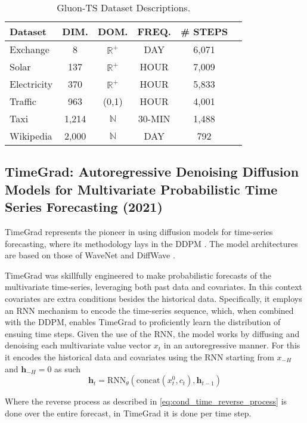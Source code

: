 \begin{table}[t] 
\centering
\begin{tabular}{lccccc} 
    \toprule
    Dataset & DIM. & DOM. & FREQ. & \# STEPS \\
    \midrule
    Exchange & 8 & $\mathbb{R}^+$ & DAY & 6,071 \\
    Solar & 137 & $\mathbb{R}^+$ & HOUR & 7,009 \\
    Electricity & 370 & $\mathbb{R}^+$ & HOUR & 5,833 \\
    Traffic & 963 & (0,1) & HOUR & 4,001 \\
    Taxi & 1,214 & $\mathbb{N}$ & 30-MIN & 1,488 \\
    Wikipedia & 2,000 & $\mathbb{N}$ & DAY & 792 \\
    \bottomrule
\end{tabular}
\caption{Gluon-TS Dataset Descriptions.}
\label{tab:gluon-datasets}
\end{table}

\subsection{TimeGrad: Autoregressive Denoising Diffusion Models for Multivariate Probabilistic Time Series Forecasting (2021) \cite{rasul_autoregressive_2021}} \label{sec:timegrad}
TimeGrad represents the pioneer in using diffusion models for time-series forecasting, where its methodology lays in the DDPM \cite{ho_denoising_2020}. 
The model architectures are based on those of WaveNet \cite{oord_wavenet_2016} and DiffWave \cite{kong_diffwave_2020}.

TimeGrad was skillfully engineered to make probabilistic forecasts of the multivariate time-series, leveraging both past data and covariates. In this context covariates are extra conditions besides the historical data.
Specifically, it employs an RNN mechanism to encode the time-series sequence, which, when combined with the DDPM, enables TimeGrad to proficiently learn the distribution of ensuing time steps. Given the use of the RNN, the model works by diffusing and denoising each multivariate value vector $x_t$ in an autoregressive manner. For this it encodes the historical data and covariates using the RNN starting from $x_{-H}$ and $\mathbf{h}_{-H} = 0$ as such
\begin{equation}
    \mathbf{h}_t = \text{RNN}_\theta(\text{concat}(x_t^0, c_t), \mathbf{h}_{t-1})
\end{equation}

Where the reverse process as described in \autoref{eq:cond_time_reverse_process} is done over the entire forecast, in TimeGrad it is done per time step.

